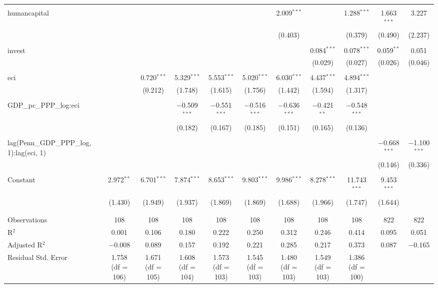 \begin{tabular}{@{\extracolsep{5pt}}lcccccccccc}
  & & & & & & & & & & \\ 
 humancapital &  &  &  &  &  & 2.009$^{***}$ &  & 1.288$^{***}$ & 1.663$^{***}$ & 3.227 \\ 
  &  &  &  &  &  & (0.403) &  & (0.379) & (0.490) & (2.237) \\ 
  & & & & & & & & & & \\ 
 invest &  &  &  &  &  &  & 0.084$^{***}$ & 0.078$^{***}$ & 0.059$^{**}$ & 0.051 \\ 
  &  &  &  &  &  &  & (0.029) & (0.027) & (0.026) & (0.046) \\ 
  & & & & & & & & & & \\ 
 eci &  & 0.720$^{***}$ & 5.329$^{***}$ & 5.553$^{***}$ & 5.020$^{***}$ & 6.030$^{***}$ & 4.437$^{***}$ & 4.894$^{***}$ &  &  \\ 
  &  & (0.212) & (1.748) & (1.615) & (1.756) & (1.442) & (1.594) & (1.317) &  &  \\ 
  & & & & & & & & & & \\ 
 GDP\_pc\_PPP\_log:eci &  &  & $-$0.509$^{***}$ & $-$0.551$^{***}$ & $-$0.516$^{***}$ & $-$0.636$^{***}$ & $-$0.421$^{**}$ & $-$0.548$^{***}$ &  &  \\ 
  &  &  & (0.182) & (0.167) & (0.185) & (0.151) & (0.165) & (0.136) &  &  \\ 
  & & & & & & & & & & \\ 
 lag(Penn\_GDP\_PPP\_log, 1):lag(eci, 1) &  &  &  &  &  &  &  &  & $-$0.668$^{***}$ & $-$1.100$^{***}$ \\ 
  &  &  &  &  &  &  &  &  & (0.146) & (0.336) \\ 
  & & & & & & & & & & \\ 
 Constant & 2.972$^{**}$ & 6.701$^{***}$ & 7.874$^{***}$ & 8.653$^{***}$ & 9.803$^{***}$ & 9.986$^{***}$ & 8.278$^{***}$ & 11.743$^{***}$ & 9.453$^{***}$ &  \\ 
  & (1.430) & (1.949) & (1.937) & (1.869) & (1.869) & (1.688) & (1.966) & (1.747) & (1.644) &  \\ 
  & & & & & & & & & & \\ 
\hline \\[-1.8ex] 
Observations & 108 & 108 & 108 & 108 & 108 & 108 & 108 & 108 & 822 & 822 \\ 
R$^{2}$ & 0.001 & 0.106 & 0.180 & 0.222 & 0.250 & 0.312 & 0.246 & 0.414 & 0.095 & 0.051 \\ 
Adjusted R$^{2}$ & $-$0.008 & 0.089 & 0.157 & 0.192 & 0.221 & 0.285 & 0.217 & 0.373 & 0.087 & $-$0.165 \\ 
Residual Std. Error & 1.758 (df = 106) & 1.671 (df = 105) & 1.608 (df = 104) & 1.573 (df = 103) & 1.545 (df = 103) & 1.480 (df = 103) & 1.549 (df = 103) & 1.386 (df = 100) &  &  \\ 

\end{tabular}
